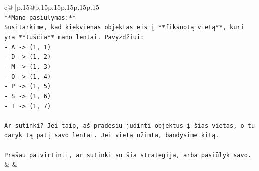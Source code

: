\documentclass{article}
\begin{document}
{\begin{supertabular}{c@{$\;$}|p{.15\linewidth}@{}p{.15\linewidth}p{.15\linewidth}p{.15\linewidth}p{.15\linewidth}p{.15\linewidth}}
{{{\\ 
\texttt{**Mano pasiūlymas:**} \\
\texttt{Susitarkime, kad kiekvienas objektas eis į **fiksuotą vietą**, kuri yra **tuščia** mano lentai. Pavyzdžiui:} \\
\texttt{{-} A {-}> (1, 1)} \\
\texttt{{-} D {-}> (1, 2)} \\
\texttt{{-} M {-}> (1, 3)} \\
\texttt{{-} O {-}> (1, 4)} \\
\texttt{{-} P {-}> (1, 5)} \\
\texttt{{-} S {-}> (1, 6)} \\
\texttt{{-} T {-}> (1, 7)} \\
\\ 
\texttt{Ar sutinki? Jei taip, aš pradėsiu judinti objektus į šias vietas, o tu daryk tą patį savo lentai. Jei vieta užimta, bandysime kitą.} \\
\\ 
\texttt{Prašau patvirtinti, ar sutinki su šia strategija, arba pasiūlyk savo.} \\
            }
        }
    }
    & & \\ \\


\end{supertabular}}
\end{document}
